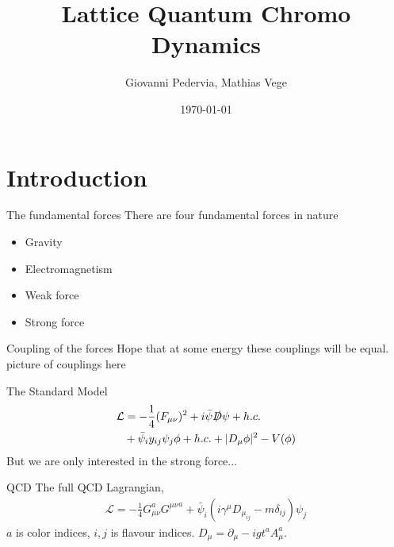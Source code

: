 \documentclass[10pt]{beamer}
\title{Lattice Quantum Chromo Dynamics}
\date{\today}
\author{Giovanni Pedervia, Mathias Vege}
\institute{University of Oslo}
\newcommand{\husk}[1]{\color{red} #1 \color{black}}
\begin{document}
\maketitle


\section{Introduction}

\begin{frame}{The fundamental forces}
	There are four fundamental forces in nature
	\begin{itemize}
		\item Gravity
		\item Electromagnetism
		\item Weak force
		\item Strong force
	\end{itemize}
\end{frame}

\begin{frame}{Coupling of the forces}
	Hope that at some energy these couplings will be equal.
	\husk{picture of couplings here}
\end{frame}

\begin{frame}{The Standard Model}
	\begin{align}
		\mathcal{L} &= - \frac{1}{4}(F_{\mu\nu})^2 + i\bar{\psi}\slashed{D}\psi + h.c. \\
		&+ \bar{\psi}_i y_{ij}\psi_j \phi + h.c. + |D_\mu\phi|^2 - V(\phi)
	\end{align}
	But we are only interested in the strong force...
\end{frame}

\begin{frame}{QCD}
	The full QCD Lagrangian,
	\begin{align}
		\mathcal{L} = -\frac{1}{4} G_{\mu\nu}^a {G^{\mu\nu}}^a + \bar{\psi}_i (i\gamma^{\mu} D_{\mu}_{ij} - m\delta_{ij})\psi_j
	\end{align}
	$a$ is color indices, $i,j$ is flavour indices. $D_\mu = \partial_\mu - i g t^a A_\mu^a$.
\end{frame}
\end{document}
